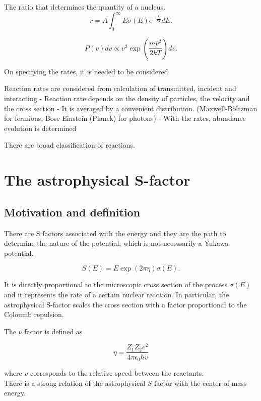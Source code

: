\documentclass[openany]{book}
\begin{document}
The ratio that determines the quantity of a nucleus.
\begin{equation}
	r = A \int_0^{\infty} { E \sigma(E) e^{-\frac{E}{kT}}  dE}.
\end{equation}

\begin{equation}
	P(v)dv \propto v^2 \exp{\left({\frac{mv^2}{2kT}}\right)}dv.
\end{equation}

On specifying the rates, it is needed to be considered.

Reaction rates are considered from calculation of transmitted, incident and interacting 
- Reaction rate depends on the density of particles, the velocity and the cross section
-	It is averaged by a convenient distribution. (Maxwell-Boltzman for fermions, Bose Einstein (Planck) for photons)
-	With the rates, abundance evolution is determined 

There are broad classification of reactions. 

\section{The astrophysical S-factor} \label{sec:sFactor}
\subsection{Motivation and definition}

There are S factors associated with the energy and they are the path to determine the nature of the potential, which is not necessarily a Yukawa potential.

\begin{equation}
	S(E) = E \exp({2\pi\eta}) \sigma({E}).
\end{equation} %

It is directly proportional to the microscopic cross section of the process $\sigma(E)$ and it represents the rate of a certain nuclear reaction. 
In particular, the astrophysical S-factor 	scales the cross section with a factor proportional to the Coloumb repulsion. 

The $\nu$ factor is defined as 

\begin{equation}
	\eta = \frac{Z_1Z_2e^2}{4\pi\epsilon_0\hbar v}
\end{equation}

where $v$ corresponds to the relative speed between the reactants. \\ 
There is a strong relation of the astrophysical $S$ factor with the center of mass energy. 
\end{document}

